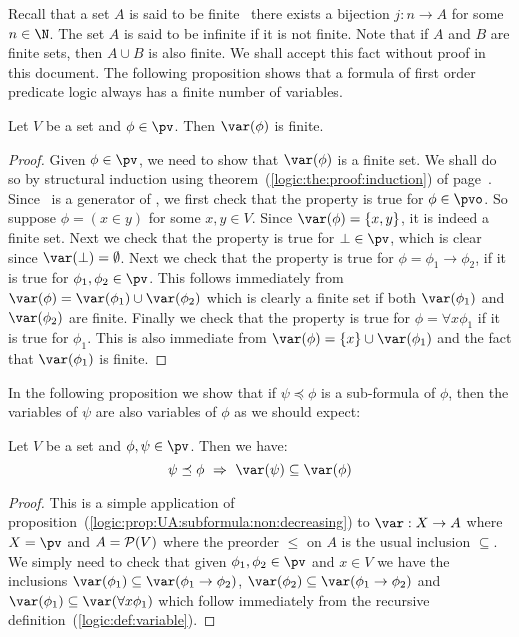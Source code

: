 Recall that a set $A$ is said to be finite \ifand\ there exists a
bijection $j:n\to A$ for some $n\in\N$. The set $A$ is said to be
infinite if it is not finite. Note that if $A$ and $B$ are finite
sets, then $A\cup B$ is also finite. We shall accept this fact
without proof in this document. The following proposition shows that
a formula of first order predicate logic always has a finite number
of variables.
\begin{prop}\label{logic:prop:var:is:finite}
Let $V$ be a set and $\phi\in\pv$. Then $\var(\phi)$ is finite.
\end{prop}
\begin{proof}
Given $\phi\in\pv$, we need to show that $\var(\phi)$ is a finite
set. We shall do so by structural induction using
theorem~(\ref{logic:the:proof:induction}) of
page~\pageref{logic:the:proof:induction}. Since \pvo\ is a generator
of \pv, we first check that the property is true for $\phi\in\pvo$.
So suppose $\phi=(x\in y)$ for some $x,y\in V$. Since
$\var(\phi)=\{x,y\}$, it is indeed a finite set. Next we check that
the property is true for $\bot\in\pv$, which is clear since
$\var(\bot)=\emptyset$. Next we check that the property is true for
$\phi=\phi_{1}\to\phi_{2}$, if it is true for
$\phi_{1},\phi_{2}\in\pv$. This follows immediately from
$\var(\phi)=\var(\phi_{1})\cup\var(\phi_{2})$ which is clearly a
finite set if both $\var(\phi_{1})$ and $\var(\phi_{2})$ are finite.
Finally we check that the property is true for $\phi=\forall
x\phi_{1}$ if it is true for $\phi_{1}$. This is also immediate from
$\var(\phi)=\{x\}\cup\var(\phi_{1})$ and the fact that
$\var(\phi_{1})$ is finite.
\end{proof}

In the following proposition we show that if $\psi\preceq\phi$ is a
sub-formula of $\phi$, then the variables of $\psi$ are also
variables of $\phi$ as we should expect:
\begin{prop}\label{logic:prop:FOPL:variable:subformula}
Let $V$ be a set and $\phi,\psi\in\pv$. Then we have:
    \[
    \psi\preceq\phi\ \Rightarrow\ \var(\psi)\subseteq\var(\phi)
    \]
\end{prop}
\begin{proof}
This is a simple application of
proposition~(\ref{logic:prop:UA:subformula:non:decreasing}) to
$\var:X\to A$ where $X=\pv$ and $A={\cal P}(V)$ where the preorder
$\leq$ on $A$ is the usual inclusion $\subseteq$. We simply need to
check that given $\phi_{1},\phi_{2}\in\pv$ and $x\in V$ we have the
inclusions $\var(\phi_{1})\subseteq\var(\phi_{1}\to\phi_{2})$,
$\var(\phi_{2})\subseteq\var(\phi_{1}\to\phi_{2})$ and
$\var(\phi_{1})\subseteq\var(\forall x\phi_{1})$ which follow
immediately from the recursive
definition~(\ref{logic:def:variable}).
\end{proof}

